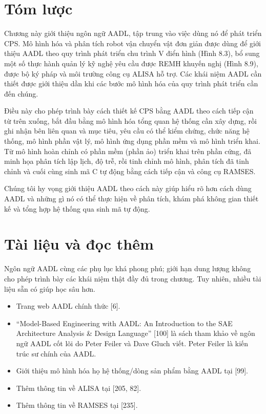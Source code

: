 \section{Tóm lược}
Chương này giới thiệu ngôn ngữ AADL, tập trung vào việc dùng nó để phát triển CPS. Mô hình hóa và phân tích robot vận chuyển vật đơn giản được dùng để giới thiệu AADL theo quy trình phát triển chu trình V điển hình (Hình 8.3), bổ sung một số thực hành quản lý kỹ nghệ yêu cầu được REMH khuyến nghị (Hình 8.9), được bộ ký pháp và môi trường công cụ ALISA hỗ trợ. Các khái niệm AADL cần thiết được giới thiệu dần khi các bước mô hình hóa của quy trình phát triển cần đến chúng.

Điều này cho phép trình bày cách thiết kế CPS bằng AADL theo cách tiếp cận từ trên xuống, bắt đầu bằng mô hình hóa tổng quan hệ thống cần xây dựng, rồi ghi nhận bên liên quan và mục tiêu, yêu cầu có thể kiểm chứng, chức năng hệ thống, mô hình phần vật lý, mô hình ứng dụng phần mềm và mô hình triển khai. Từ mô hình hoàn chỉnh có phần mềm (phần ảo) triển khai trên phần cứng, đã minh họa phân tích lập lịch, độ trễ, rồi tinh chỉnh mô hình, phân tích đã tinh chỉnh và cuối cùng sinh mã C tự động bằng cách tiếp cận và công cụ RAMSES.

Chúng tôi hy vọng giới thiệu AADL theo cách này giúp hiểu rõ hơn cách dùng AADL và những gì nó có thể thực hiện về phân tích, khám phá không gian thiết kế và tổng hợp hệ thống qua sinh mã tự động.

\section{Tài liệu và đọc thêm}
Ngôn ngữ AADL cùng các phụ lục khá phong phú; giới hạn dung lượng không cho phép trình bày các khái niệm thật đầy đủ trong chương. Tuy nhiên, nhiều tài liệu sẵn có giúp học sâu hơn.
\begin{itemize}
\item Trang web AADL chính thức [6].
\item ``Model-Based Engineering with AADL: An Introduction to the SAE Architecture Analysis \& Design Language'' [100] là sách tham khảo về ngôn ngữ AADL cốt lõi do Peter Feiler và Dave Gluch viết. Peter Feiler là kiến trúc sư chính của AADL.
\item Giới thiệu mô hình hóa họ hệ thống/dòng sản phẩm bằng AADL tại [99].
\item Thêm thông tin về ALISA tại [205, 82].
\item Thêm thông tin về RAMSES tại [235].
\end{itemize}

